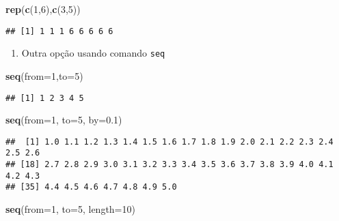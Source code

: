 \documentclass[]{article}
\newenvironment{Shaded}{\begin{snugshade}}{\end{snugshade}}
\newcommand{\KeywordTok}[1]{\textcolor[rgb]{0.13,0.29,0.53}{\textbf{#1}}}
\newcommand{\DataTypeTok}[1]{\textcolor[rgb]{0.13,0.29,0.53}{#1}}
\newcommand{\DecValTok}[1]{\textcolor[rgb]{0.00,0.00,0.81}{#1}}
\newcommand{\FloatTok}[1]{\textcolor[rgb]{0.00,0.00,0.81}{#1}}
\newcommand{\NormalTok}[1]{#1}
\providecommand{\tightlist}{%
  \setlength{\itemsep}{0pt}\setlength{\parskip}{0pt}}
\begin{document}
\begin{Shaded}
\begin{Highlighting}[]
\KeywordTok{rep}\NormalTok{(}\KeywordTok{c}\NormalTok{(}\DecValTok{1}\NormalTok{,}\DecValTok{6}\NormalTok{),}\KeywordTok{c}\NormalTok{(}\DecValTok{3}\NormalTok{,}\DecValTok{5}\NormalTok{))}
\end{Highlighting}
\end{Shaded}

\begin{verbatim}
## [1] 1 1 1 6 6 6 6 6
\end{verbatim}

\begin{enumerate}
\def\labelenumi{\arabic{enumi}.}
\setcounter{enumi}{3}
\tightlist
\item
  Outra opção usando comando \texttt{seq}
\end{enumerate}

\begin{Shaded}
\begin{Highlighting}[]
\KeywordTok{seq}\NormalTok{(}\DataTypeTok{from=}\DecValTok{1}\NormalTok{,}\DataTypeTok{to=}\DecValTok{5}\NormalTok{)}
\end{Highlighting}
\end{Shaded}

\begin{verbatim}
## [1] 1 2 3 4 5
\end{verbatim}

\begin{Shaded}
\begin{Highlighting}[]
\KeywordTok{seq}\NormalTok{(}\DataTypeTok{from=}\DecValTok{1}\NormalTok{, }\DataTypeTok{to=}\DecValTok{5}\NormalTok{, }\DataTypeTok{by=}\FloatTok{0.1}\NormalTok{)}
\end{Highlighting}
\end{Shaded}

\begin{verbatim}
##  [1] 1.0 1.1 1.2 1.3 1.4 1.5 1.6 1.7 1.8 1.9 2.0 2.1 2.2 2.3 2.4 2.5 2.6
## [18] 2.7 2.8 2.9 3.0 3.1 3.2 3.3 3.4 3.5 3.6 3.7 3.8 3.9 4.0 4.1 4.2 4.3
## [35] 4.4 4.5 4.6 4.7 4.8 4.9 5.0
\end{verbatim}

\begin{Shaded}
\begin{Highlighting}[]
\KeywordTok{seq}\NormalTok{(}\DataTypeTok{from=}\DecValTok{1}\NormalTok{, }\DataTypeTok{to=}\DecValTok{5}\NormalTok{, }\DataTypeTok{length=}\DecValTok{10}\NormalTok{)}
\end{Highlighting}
\end{Shaded}
\end{document}
